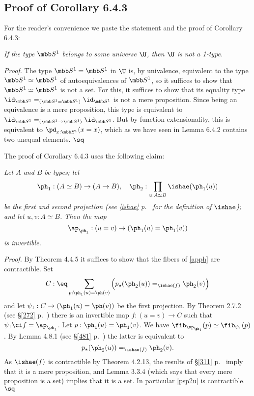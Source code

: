 \documentclass[12pt]{article}
\begin{document}

\subsection{Proof of Corollary 6.4.3} %

For the reader's convenience we paste the statement and the proof of Corollary 6.4.3:

\nn{} \emph{If the type $\mbb S^1$ belongs to some universe $\U$, then $\U$ is not a 1-type.}

\nn\emph{Proof.} The type $\mbb S^1=\mbb S^1$ in $\U$ is, by univalence, equivalent to the type $\mbb S^1\simeq\mbb S^1$ of auto\-equivalences of $\mbb S^1$, so it suffices to show that $\mbb S^1\simeq\mbb S^1$ is not a set. For this, it suffices to show that its equality type $\id_{\mbb S^1}=_{(\mbb S^1=\mbb S^1)}\id_{\mbb S^1}$ is not a mere proposition. Since being an equivalence is a mere proposition, this type is equivalent to $\id_{\mbb S^1}=_{(\mbb S^1\to\mbb S^1)}\id_{\mbb S^1}$. But by function extensionality, this is equivalent to $\pd_{x:\mbb S^1}(x=x)$, which as we have seen in Lemma 6.4.2 contains two unequal elements. $\sq$

The proof of Corollary 6.4.3 uses the following claim:

\nn{} \emph{Let $A$ and $B$ be types; let  
$$
\ph_1:(A\simeq B)\to(A\to B),\quad\ph_2:\prod_{u:A\simeq B}\ishae(\ph_1(u))
$$ 
be the first and second projection (see \eqref{ishae} p.~\pageref{ishae} for the definition of $\ishae$); and let $u,v:A\simeq B$. Then the map 
\begin{equation}\label{apph}
\ap_{\ph_1}:(u=v)\to(\ph_1(u)=\ph_1(v))
\end{equation}
is invertible.}

\nn\emph{Proof.} By Theorem 4.4.5 it suffices to show that the fibers of \eqref{apph} are contractible. Set 
$$
C:\eq\sum_{p:\ph_1(u)=\ph(v)}\Big(p_\star(\ph_2(u))=_{\ishae(f)}\ph_2(v)\Big)
$$ 
and let $\psi_1:C\to(\ph_1(u)=\ph(v))$ be the first projection. By Theorem 2.7.2 (see \S\ref{272} p.~\pageref{272}) there is an invertible map $f:(u=v)\to C$ such that $\psi_1\ci f=\ap_{\ph_1}$. Let $p:\ph_1(u)=\ph_1(v)$. We have $\fib_{\ap_{\ph_1}}(p)\simeq\fib_{\psi_1}(p)$. By Lemma 4.8.1 (see \S\ref{481} p.~\pageref{481}) the latter is equivalent to 
\begin{equation}\label{psp2u}
p_\star(\ph_2(u))=_{\ishae(f)}\ph_2(v).
\end{equation}  
As $\ishae(f)$ is contractible by Theorem 4.2.13, the results of \S\ref{311} p.~\pageref{311} imply that it is a mere proposition, and Lemma 3.3.4 (which says that every mere proposition is a set) implies that it is a set. In particular \eqref{psp2u} is contractible. $\sq$
\end{document}

